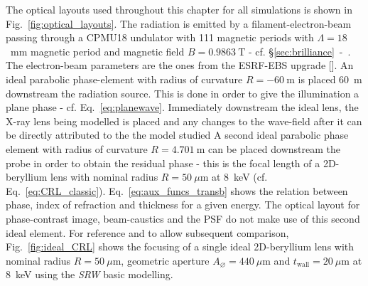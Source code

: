 \begin{refsection}
The optical layouts used throughout this chapter for all simulations is shown in Fig.~\ref{fig:optical_layouts}. The radiation is emitted by a filament-electron-beam passing through a CPMU18 undulator with 111 magnetic periods with $\Lambda=18$~mm magnetic period and magnetic field $B=0.9863~$T - cf. \S\ref{sec:brilliance}~-~\textit{}. The electron-beam parameters are the ones from the ESRF-EBS upgrade [\cite{orangebook}]. An ideal parabolic phase-element with radius of curvature $R=-60~$m is placed 60~m downstream the radiation source. This is done in order to give the illumination a plane phase - cf. Eq.~\ref{eq:planewave}. Immediately downstream the ideal lens, the X-ray lens being modelled is placed and any changes to the wave-field after it can be directly attributed to the the model studied A second ideal parabolic phase element with radius of curvature $R=4.701~$m can be placed downstream the probe in order to obtain the residual phase - this is the focal length of a 2D-beryllium lens with nominal radius $R=50~\mu\text{m}$ at 8~keV (cf. Eq.~\ref{eq:CRL_classic}). Eq.~\ref{eq:aux_funcs_transb} shows the relation between phase, index of refraction and thickness for a given energy. The optical layout for phase-contrast image, beam-caustics and the PSF do not make use of this second ideal element. For reference and to allow subsequent comparison, Fig.~\ref{fig:ideal_CRL} shows the focusing of a single ideal 2D-beryllium lens with nominal radius $R=50~\mu\text{m}$, geometric aperture $A_{\diameter}=440~\mu\text{m}$ and $t_\text{wall}=20~\mu$m at 8~keV using the \textit{SRW} basic modelling. 


\end{refsection}
